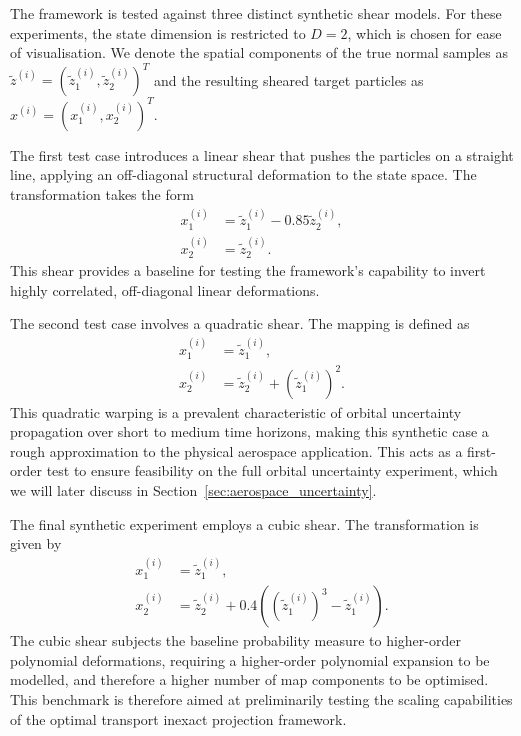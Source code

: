 The framework is tested against three distinct synthetic shear models. For these experiments, the state dimension is restricted to $D = 2$, which is chosen for ease of visualisation. We denote the spatial components of the true normal samples as $\tilde{z}^{(i)} = (\tilde{z}^{(i)}_1, \tilde{z}^{(i)}_2)^T$ and the resulting sheared target particles as $x^{(i)} = (x^{(i)}_1, x^{(i)}_2)^T$.

The first test case introduces a linear shear that pushes the particles on a straight line, applying an off-diagonal structural deformation to the state space. The transformation takes the form
\begin{align*}
    x^{(i)}_1 &= \tilde{z}^{(i)}_1 - 0.85 \tilde{z}^{(i)}_2, \\
    x^{(i)}_2 &= \tilde{z}^{(i)}_2.
\end{align*}
This shear provides a baseline for testing the framework's capability to invert highly correlated, off-diagonal linear deformations.

The second test case involves a quadratic shear. The mapping is defined as
\begin{align*}
    x^{(i)}_1 &= \tilde{z}^{(i)}_1, \\
    x^{(i)}_2 &= \tilde{z}^{(i)}_2 + \left( \tilde{z}^{(i)}_1 \right)^2.
\end{align*}
This quadratic warping is a prevalent characteristic of orbital uncertainty propagation over short to medium time horizons, making this synthetic case a rough approximation to the physical aerospace application. This acts as a first-order test to ensure feasibility on the full orbital uncertainty experiment, which we will later discuss in Section~\ref{sec:aerospace_uncertainty}. \newpage

The final synthetic experiment employs a cubic shear. The transformation is given by
\begin{align*}
    x^{(i)}_1 &= \tilde{z}^{(i)}_1, \\
    x^{(i)}_2 &= \tilde{z}^{(i)}_2 + 0.4 \left( \left( \tilde{z}^{(i)}_1 \right)^3 - \tilde{z}^{(i)}_1 \right).
\end{align*}
The cubic shear subjects the baseline probability measure to higher-order polynomial deformations, requiring a higher-order polynomial expansion to be modelled, and therefore a higher number of map components to be optimised. This benchmark is therefore aimed at preliminarily testing the scaling capabilities of the optimal transport inexact projection framework.

